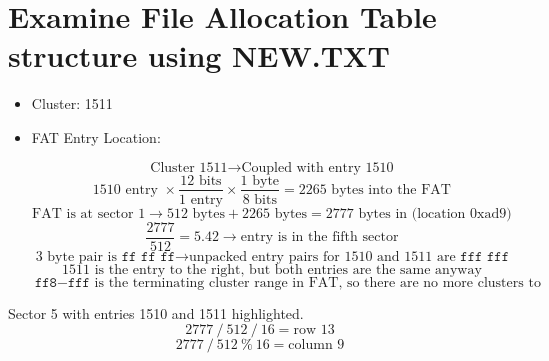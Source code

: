 \documentclass{article}
\begin{document}
    \section{Examine File Allocation Table structure using NEW.TXT}\label{sec:new_fat}

    \begin{itemize}
        \item Cluster: 1511
        \item FAT Entry Location:
        \begin{itemize}
            \[ \text{Cluster 1511} \rightarrow \text{Coupled with entry 1510} \]
            \[ 1510 \text{ entry } \times \frac{\text{12 bits}}{\text{1 entry}} \times \frac{1 \text{ byte}}{8 \text{ bits}} = 2265 \text{ bytes into the FAT} \]
            \[ \text{FAT is at sector 1} \rightarrow 512 \text{ bytes} + 2265 \text{ bytes} = 2777 \text{ bytes in (location 0xad9)} \]
            \[ \frac{2777}{512} = 5.42 \rightarrow \text{entry is in the fifth sector} \]
             \[ \text{3 byte pair is } \texttt{ff ff ff} \rightarrow \text{unpacked entry pairs for 1510 and 1511 are } \texttt{fff fff} \]
            \[ 1511 \text{ is the entry to the right, but both entries are the same anyway} \]
            \[ \texttt{ff8} - \texttt{fff} \text{ is the terminating cluster range in FAT, so there are no more clusters to trace through. This makes sense given that the size of the file is 127 bytes and a sector is 512 bytes.} \]
        \end{itemize}
    \end{itemize}

    Sector 5 with entries 1510 and 1511 highlighted.
    \[2777~/~512~/~16 = \text{row 13}\]
    \[2777~/~512~\%~16 = \text{column 9}\]
\end{document}
